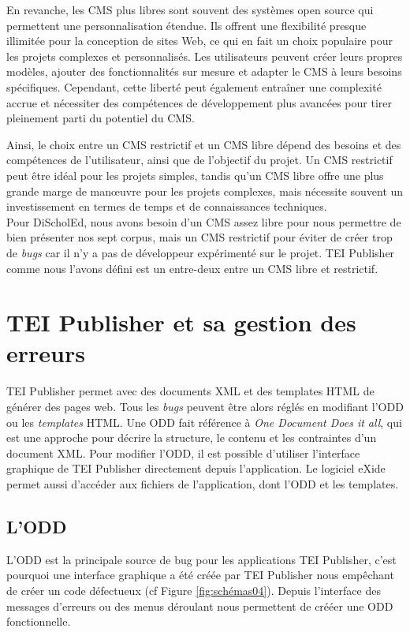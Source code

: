 En revanche, les CMS plus libres sont souvent des systèmes open source qui permettent une personnalisation étendue. Ils offrent une flexibilité presque illimitée pour la conception de sites Web, ce qui en fait un choix populaire pour les projets complexes et personnalisés. Les utilisateurs peuvent créer leurs propres modèles, ajouter des fonctionnalités sur mesure et adapter le CMS à leurs besoins spécifiques. Cependant, cette liberté peut également entraîner une complexité accrue et nécessiter des compétences de développement plus avancées pour tirer pleinement parti du potentiel du CMS.

Ainsi, le choix entre un CMS restrictif et un CMS libre dépend des besoins et des compétences de l'utilisateur, ainsi que de l'objectif du projet. Un CMS restrictif peut être idéal pour les projets simples, tandis qu'un CMS libre offre une plus grande marge de manœuvre pour les projets complexes, mais nécessite souvent un investissement en termes de temps et de connaissances techniques. \\

Pour DiScholEd, nous avons besoin d'un CMS assez libre pour nous permettre de bien présenter nos sept corpus, mais un CMS restrictif pour éviter de créer trop de \textit{bugs} car il n'y a pas de développeur expérimenté sur le projet. TEI Publisher comme nous l'avons défini est un entre-deux entre un CMS libre et restrictif.
\section{TEI Publisher et sa gestion des erreurs}
TEI Publisher permet avec des documents XML et des templates HTML de générer des pages web. Tous les \textit{bugs} peuvent être alors réglés en modifiant l'ODD ou les \textit{templates} HTML. Une ODD fait référence à \textit{One Document Does it all}, qui est une approche pour décrire la structure, le contenu et les contraintes d'un document XML. Pour modifier l'ODD, il est possible d'utiliser l'interface graphique de TEI Publisher directement depuis l'application. Le logiciel eXide permet aussi d'accéder aux fichiers de l'application, dont l'ODD et les templates.

\subsection{L'ODD}

L'ODD est la principale source de bug pour les applications TEI Publisher, c'est pourquoi une interface graphique a été créée par TEI Publisher nous empêchant de créer un code défectueux (cf Figure \ref{fig:schémas04}). Depuis l'interface des messages d'erreurs ou des menus déroulant nous permettent de crééer une ODD fonctionnelle.

